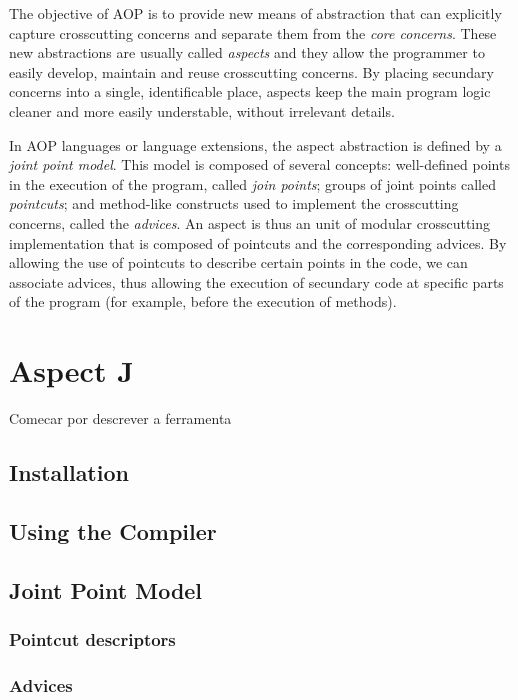 \documentclass{template}
\begin{document}
The objective of AOP is to provide new means of abstraction that can explicitly capture crosscutting concerns
and separate them from the \emph{core concerns}. These new abstractions are usually called \emph{aspects}
and they allow the programmer to easily develop, maintain and reuse crosscutting concerns. By placing
secundary concerns into a single, identificable place, aspects keep the main program logic cleaner and more easily
understable, without irrelevant details.

In AOP languages or language extensions, the aspect abstraction is defined by a \emph{joint point model}.
This model is composed of several concepts: well-defined points in the execution of the program,
called \emph{join points}; groups of joint points called \emph{pointcuts}; and method-like constructs used to
implement the crosscutting concerns, called the \emph{advices}. An aspect is thus an unit of modular
crosscutting implementation that is composed of pointcuts and the corresponding advices. By allowing the
use of pointcuts to describe certain points in the code, we can associate advices, thus allowing the execution
of secundary code at specific parts of the program (for example, before the execution of methods).

\section{Aspect J}

Comecar por descrever a ferramenta

\subsection{Installation}

\subsection{Using the Compiler}

\subsection{Joint Point Model}

\subsubsection{Pointcut descriptors}
\subsubsection{Advices}
\end{document}
